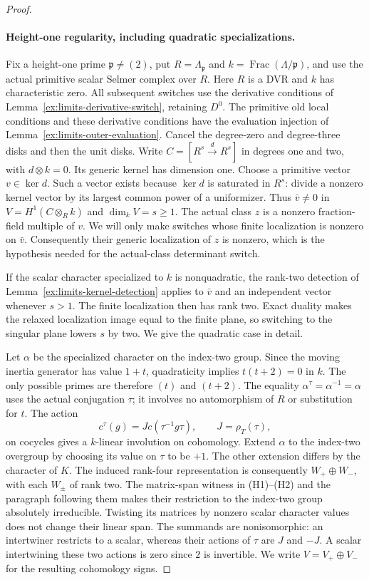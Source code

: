 \documentclass[11pt]{article}
\theoremstyle{definition}
\theoremstyle{remark}
\begin{document}
\begin{proof}
\paragraph{Height-one regularity, including quadratic specializations.}
Fix a height-one prime $\mathfrak p\ne(2)$, put
$R=\Lambda_{\mathfrak p}$ and $k=\operatorname{Frac}(\Lambda/\mathfrak p)$,
and use the actual primitive scalar Selmer complex over $R$.
Here $R$ is a DVR and $k$ has characteristic zero. All subsequent
switches use the derivative conditions of
Lemma~\ref{ex:limits-derivative-switch}, retaining $D^0$.
The primitive old local conditions and these derivative conditions have
the evaluation injection of Lemma~\ref{ex:limits-outer-evaluation}.
Cancel the degree-zero and degree-three disks and then the unit disks.
Write $C=[R^s\xrightarrow{d}R^s]$ in degrees one and two, with
$d\otimes k=0$. Its generic kernel has dimension one. Choose a primitive
vector $v\in\ker d$. Such a vector exists because $\ker d$ is saturated
in $R^s$: divide a nonzero kernel vector by its largest common power
of a uniformizer. Thus $\bar v\ne0$ in
$V=H^1(C\otimes_R k)$ and $\dim_k V=s\ge1$.
The actual class $z$ is a nonzero fraction-field multiple of $v$.
We will only make switches whose finite localization is nonzero on
$\bar v$. Consequently their generic localization of $z$ is nonzero,
which is the hypothesis needed for the actual-class determinant switch.

If the scalar character specialized to $k$ is nonquadratic, the
rank-two detection of Lemma~\ref{ex:limits-kernel-detection} applies to
$\bar v$ and an independent vector whenever $s>1$. The finite
localization then has rank two. Exact duality makes the relaxed
localization image equal to the finite plane, so switching to the
singular plane lowers $s$ by two. We give the quadratic case in detail.

Let $\alpha$ be the specialized character on the index-two group.
Since the moving inertia generator has value $1+t$, quadraticity
implies $t(t+2)=0$ in $k$. The only possible primes are therefore
$(t)$ and $(t+2)$. The equality $\alpha^\tau=\alpha^{-1}=\alpha$
uses the actual conjugation $\tau$; it involves no automorphism of
$R$ or substitution for $t$. The action
\[
 c^\tau(g)=Jc(\tau^{-1}g\tau),\qquad J=\rho_T(\tau),
\]
on cocycles gives a $k$-linear involution on cohomology. Extend
$\alpha$ to the index-two overgroup by choosing its value on $\tau$
to be $+1$. The other extension differs by the character of $K$.
The induced rank-four representation is consequently
$W_+\oplus W_-$, with each $W_\pm$ of rank two. The matrix-span
witness in (H1)--(H2) and the paragraph following them makes their
restriction to the index-two group absolutely irreducible. Twisting
its matrices by nonzero scalar character values does not change their
linear span. The summands are nonisomorphic: an intertwiner restricts
to a scalar, whereas their actions of $\tau$ are $J$ and $-J$.
A scalar intertwining these two actions is zero since $2$ is invertible.
We write $V=V_+\oplus V_-$ for the resulting cohomology signs.


\end{proof}
\end{document}
